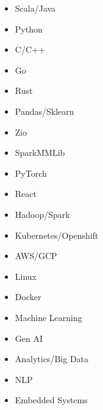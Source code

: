 \documentclass[a4paper]{Resume}
\begin{document}
\begin{minipage}{.25\textwidth}
  \textcolor{\HeadingColour}{}
  \vspace{1em}
  \begin{itemize}
  \item{Scala/Java}
  \item{Python}
  \item{C/C++}
  \item{Go}
  \item{Rust}
  
  \end{itemize}
\end{minipage}%
\begin{minipage}{.25\textwidth}
  \textcolor{\HeadingColour}{}
  \vspace{1em}
    \begin{itemize}
  \item{Pandas/Sklearn}
  \item{Zio}
  \item{SparkMMLib}
  \item{PyTorch}
  \item{React}
  
  \end{itemize}
\end{minipage}%
\begin{minipage}{.25\textwidth}
  \textcolor{\HeadingColour}{}
  \vspace{1em}
    \begin{itemize}
  \item{Hadoop/Spark}
  \item{Kubernetes/Openshift}
  \item{AWS/GCP}
  \item{Linux}
  \item{Docker}
  
  \end{itemize}
\end{minipage}%
\begin{minipage}{.25\textwidth}
  \textcolor{\HeadingColour}{}
  \vspace{1em}
    \begin{itemize}
  \item{Machine Learning}
  \item{Gen AI}
  \item{Analytics/Big Data}
  \item{NLP}
  \item{Embedded Systems}
  
  \end{itemize}
\end{minipage}
\end{document}
